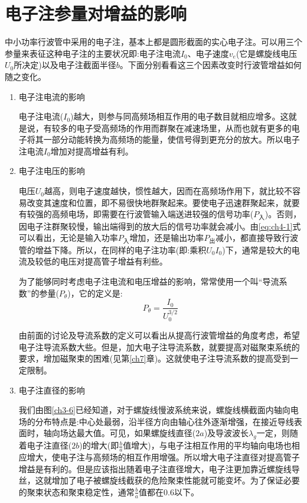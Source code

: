 \section{电子注参量对增益的影响}
中小功率行波管中采用的电子注，基本上都是圆形截面的实心电子注。可以用三个参量来表征这种电子注的主要状况即:电子注电流$ I_0 $、电子速度$ v_e $(它是螺旋线电压$ U_0 $所决定)以及电子注截面半径$ b $。下面分别看看这三个因素改变时行波管增益如何随之变化。
\begin{enumerate}
	\item 电子注电流的影响
	
	电子注电流($ I_0 $)越大，则参与同高频场相互作用的电子数目就相应增多。这就是说，有较多的电子受高频场的作用而群聚在减速场里，从而也就有更多的电子将其一部分动能转换为高频场的能量，使信号得到更充分的放大。所以电子注电流$ I_0 $增加对提高增益有利。
	\item 电子注电压的影响
	
	电压$ U_0 $越高，则电子速度越快，惯性越大，因而在高频场作用下，就比较不容易改变其速度和位置，即不易很快地群聚起来。要使电子迅速群聚起来，就要有较强的高频电场，即需要在行波管输入端送进较强的信号功率($ P_\text{入} $)。否则，因电子注群聚较慢，输出端得到的放大后的信号功率就会减小。由\ref{eq:ch4-1}式可以看出，无论是输入功率$ P_\text{入} $增加，还是输出功率$ P_\text{出} $减小，都直接导致行波管的增益下降。所以，在同样的电子注功率(即:乘积$ U_0I_0 $)下，通常是较大的电流及较低的电压对提高管子增益有利些。
	
	
	为了能够同时考虑电子注电流和电压增益的影响，常常使用一个叫“导流系数”的参量($ P_\theta $)，它的定义是:
	\begin{equation} \label{eq:ch4-2}
		P_\theta = \frac{I_0}{U_0^{3/2}}
	\end{equation}
	
  由前面的讨论及导流系数的定义可以看出从提高行波管增益的角度考虑，希望电子注导流系数大些。但是，加大电子注导流系数，就要提高对磁聚束系统的要求，增加磁聚束的困难(见第\ref{ch7}章)。这就使电子注导流系数的提高受到一定限制。
	\item 电子注直径的影响
	
	我们由图\ref{ch3-6}已经知道，对于螺旋线慢波系统来说，螺旋线横截面内轴向电场的分布特点是:中心处最弱，沿半径方向由轴心往外逐渐增强，在接近导线表面时，轴向场达最大值。可见，如果螺旋线直径($ 2a $)及导波波长$ \lambda_g $一定，则随着电子注直径($ 2b $)的增大(即$ \frac{b}{a} $值增大)，与电子注相互作用的平均轴向电场也相应增大，使电子注与高频场的相互作用增强。所以增大电子注直径对提高管子增益是有利的。但是应该指出随着电子注直径增大，电子注更加靠近螺旋线导丝，这就增加了电子被螺旋线截获的危险聚束性能就可能变坏。为了保证必要的聚束状态和聚束稳定性，通常$ \frac{b}{a} $值都在0.6以下。
\end{enumerate}



